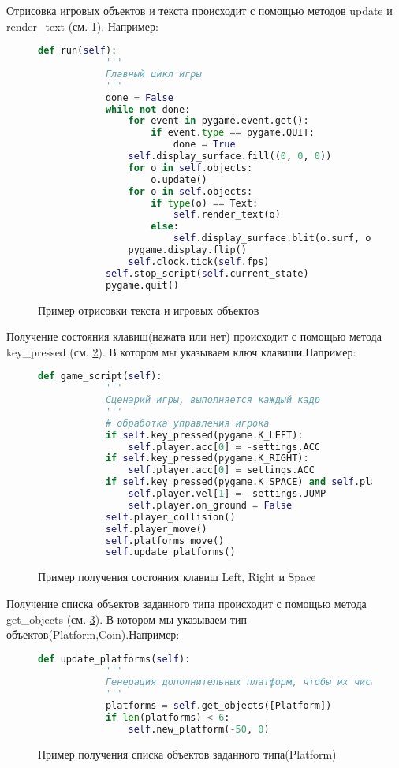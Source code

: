 Отрисовка игровых объектов и текста происходит с помощью методов update и render\_text (см. \ref{rendertxt:imgage}). Например:

\begin{figure}[H]
	\begin{lstlisting}[language=Python]
	    def run(self):
			'''
			Главный цикл игры
			'''	
			done = False
			while not done:
				for event in pygame.event.get():
					if event.type == pygame.QUIT:
						done = True
				self.display_surface.fill((0, 0, 0))
				for o in self.objects:
					o.update()
				for o in self.objects:
					if type(o) == Text:
						self.render_text(o)
					else:
						self.display_surface.blit(o.surf, o.rect)
				pygame.display.flip()
				self.clock.tick(self.fps)
			self.stop_script(self.current_state)
			pygame.quit()
	\end{lstlisting}
	\caption{Пример отрисовки текста и игровых объектов}
	\label{rendertxt:imgage}
\end{figure}

Получение состояния клавиш(нажата или нет) происходит с помощью метода key\_pressed (см. \ref{keyp:imgage}). В котором мы указываем ключ клавиши.Например:

\begin{figure}[H]
	\begin{lstlisting}[language=Python]
		def game_script(self):
			'''
			Сценарий игры, выполняется каждый кадр
			'''
			# обработка управления игрока
			if self.key_pressed(pygame.K_LEFT):
				self.player.acc[0] = -settings.ACC
			if self.key_pressed(pygame.K_RIGHT):
				self.player.acc[0] = settings.ACC
			if self.key_pressed(pygame.K_SPACE) and self.player.on_ground:
				self.player.vel[1] = -settings.JUMP
				self.player.on_ground = False
			self.player_collision()
			self.player_move()
			self.platforms_move()
			self.update_platforms()
	\end{lstlisting}
	\caption{Пример получения состояния клавиш Left, Right и Space}
	\label{keyp:imgage}
\end{figure}

Получение списка объектов заданного типа происходит с помощью метода get\_objects (см. \ref{GetOb:imgage}). В котором мы указываем тип объектов(Platform,Coin).Например:

\begin{figure}[H]
	\begin{lstlisting}[language=Python]
		def update_platforms(self):
			'''
			Генерация дополнительных платформ, чтобы их число было 6
			'''
			platforms = self.get_objects([Platform])
			if len(platforms) < 6:
				self.new_platform(-50, 0)
	\end{lstlisting}
	\caption{Пример получения списка объектов заданного типа(Platform)}
	\label{GetOb:imgage}
\end{figure}

